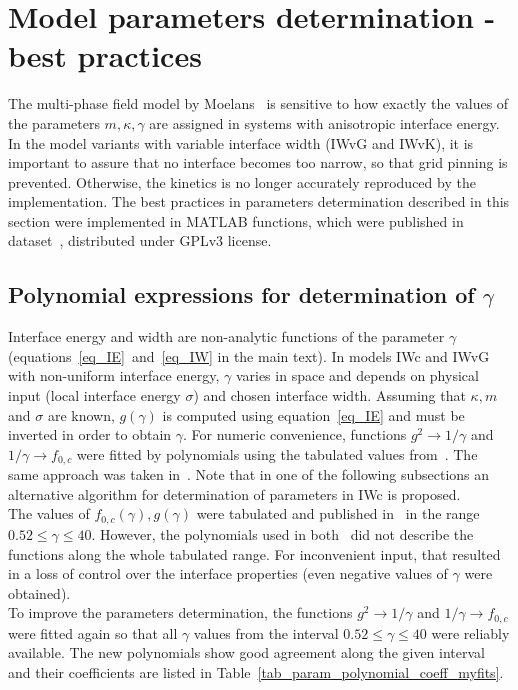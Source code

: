 \chapter{Model parameters determination - best practices}
\label{sec_suppl_param_det}
The multi-phase field model by Moelans~\cite{Moelans2008} is sensitive to how exactly the values of the parameters $m, \kappa, \gamma$ are assigned in systems with anisotropic interface energy. In the model variants with variable interface width (IWvG and IWvK), it is important to assure that no interface becomes too narrow, so that grid pinning is prevented. Otherwise, the kinetics is no longer accurately reproduced by the implementation. The best practices in parameters determination described in this section were implemented in MATLAB functions, which were published in dataset~\cite{Minar2022dataset}, distributed under GPLv3 license.

\section*{Polynomial expressions for determination of $\gamma$} \label{sec_param_det_polynomials}
Interface energy and width are non-analytic functions of the parameter $\gamma$  (equations~\eqref{eq_IE}~and~\eqref{eq_IW} in the main text). In models IWc and IWvG with non-uniform interface energy, $\gamma$ varies in space and depends on physical input (local interface energy $\sigma$) and chosen interface width. Assuming that $\kappa,m$ and $\sigma$ are known, $g(\gamma)$ is computed using equation~\eqref{eq_IE} and must be inverted in order to obtain $\gamma$. For numeric convenience, functions $g^2\rightarrow 1/\gamma$ and $ 1/\gamma \rightarrow f_{0,c}$ were fitted by polynomials using the tabulated values from~\cite{Ravash2017}. The same approach was taken in~\cite{Moelans2008}. Note that in one of the following subsections an alternative algorithm for determination of parameters in IWc is proposed. \\
The values of $f_{0,c}(\gamma),g(\gamma)$ were tabulated and published in~\cite{Ravash2017} in the range $0.52\leq\gamma\leq 40$. However, the polynomials used in both~\cite{Moelans2008,Ravash2017} did not describe the functions along the whole tabulated range. For inconvenient input, that resulted in a loss of control over the interface properties (even negative values of $\gamma$ were obtained). \\
To improve the parameters determination, the functions $g^2\rightarrow 1/\gamma$ and $ 1/\gamma \rightarrow f_{0,c}$ were fitted again so that all $\gamma$ values from the interval $0.52\leq\gamma\leq 40$ were reliably available. The new polynomials show good agreement along the given interval and their coefficients are listed in Table~\ref{tab_param_polynomial_coeff_myfits}. 

